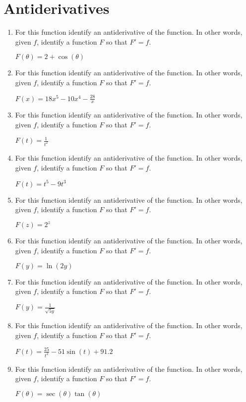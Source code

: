 \documentclass[12pt]{report}
\begin{document}
\newcommand{\less}{\textless}
\newcommand{\greater}{\textgreater}
\newcommand{\reals}{\mathbb{R}}
\newcommand{\integers}{\mathbb{Z}}
\newcommand{\rationals}{\mathbb{Q}}
\newcommand{\dsp}{\displaystyle}



\section*{Antiderivatives}

\begin{enumerate}

\item For this function identify an antiderivative of the function. In other words, given $f$, identify a function $F$ so that $F'=f$.

$F(\theta)=2+\cos(\theta)$

\item For this function identify an antiderivative of the function. In other words, given $f$, identify a function $F$ so that $F'=f$.

$F(x)=18x^5-10x^4-\frac{28}{x}$

\item For this function identify an antiderivative of the function. In other words, given $f$, identify a function $F$ so that $F'=f$.

$F(t)=\frac{1}{t^2}$

\item For this function identify an antiderivative of the function. In other words, given $f$, identify a function $F$ so that $F'=f$.

$F(t)=t^5-9t^3$



\item For this function identify an antiderivative of the function. In other words, given $f$, identify a function $F$ so that $F'=f$.

$F(z)=2^z$

\item For this function identify an antiderivative of the function. In other words, given $f$, identify a function $F$ so that $F'=f$.

$F(y)=\ln(2y)$

\item For this function identify an antiderivative of the function. In other words, given $f$, identify a function $F$ so that $F'=f$.

$F(y)=\frac{1}{\sqrt{5y}}$

\item For this function identify an antiderivative of the function. In other words, given $f$, identify a function $F$ so that $F'=f$.

$F(t)=\frac{25}{t^2}-51\sin(t)+91.2$

\item For this function identify an antiderivative of the function. In other words, given $f$, identify a function $F$ so that $F'=f$.

$F(\theta)=\sec(\theta)\tan(\theta)$

\end{enumerate}
\end{document}
